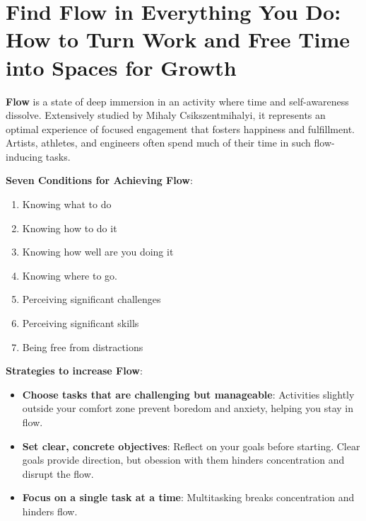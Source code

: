 \section*{Find Flow in Everything You Do: How to Turn Work and Free Time into Spaces for Growth}

\textbf{Flow} is a state of deep immersion in an activity where time and self-awareness dissolve. Extensively studied by Mihaly Csikszentmihalyi, it represents an optimal experience of focused engagement that fosters happiness and fulfillment. Artists, athletes, and engineers often spend much of their time in such flow-inducing tasks.

\textbf{Seven Conditions for Achieving Flow}:
\begin{multicols}{2}
\begin{enumerate}
    \item Knowing what to do
    \item Knowing how to do it 
    \item Knowing how well are you doing it
    \item Knowing where to go.
    \item Perceiving significant challenges
    \item Perceiving significant skills
    \item Being free from distractions
\end{enumerate}
\end{multicols}

\textbf{Strategies to increase Flow}:
\begin{itemize}
    \item \textbf{Choose tasks that are challenging but manageable}: Activities slightly outside your comfort zone prevent boredom and anxiety, helping you stay in flow.
    \item \textbf{Set clear, concrete objectives}: Reflect on your goals before starting. Clear goals provide direction, but obession with them hinders concentration and disrupt the flow.
    \item \textbf{Focus on a single task at a time}: Multitasking breaks concentration and hinders flow.
\end{itemize}

